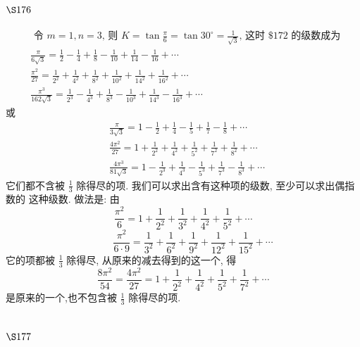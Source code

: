 \section{$\S 176$}
\[
\begin{aligned}
& \text { 令 } m=1, n=3 \text {, 则 } K=\tan \frac{\pi}{6}=\tan 30^{\circ}=\frac{1}{\sqrt{3}} \text {, 这时 } \$ 172 \text { 的级数成为 } \\
& \frac{\pi}{6 \sqrt{3}}=\frac{1}{2}-\frac{1}{4}+\frac{1}{8}-\frac{1}{10}+\frac{1}{14}-\frac{1}{16}+\cdots \\
& \frac{\pi^{2}}{27}=\frac{1}{2^{2}}+\frac{1}{4^{2}}+\frac{1}{8^{2}}+\frac{1}{10^{2}}+\frac{1}{14^{2}}+\frac{1}{16^{2}}+\cdots \\
& \frac{\pi^{3}}{162 \sqrt{3}}=\frac{1}{2^{3}}-\frac{1}{4^{3}}+\frac{1}{8^{3}}-\frac{1}{10^{3}}+\frac{1}{14^{3}}-\frac{1}{16^{3}}+\cdots
\end{aligned}
\]
或
\[
\begin{aligned}
& \frac{\pi}{3 \sqrt{3}}=1-\frac{1}{2}+\frac{1}{4}-\frac{1}{5}+\frac{1}{7}-\frac{1}{8}+\cdots \\
& \frac{4 \pi^{2}}{27}=1+\frac{1}{2^{2}}+\frac{1}{4^{2}}+\frac{1}{5^{2}}+\frac{1}{7^{2}}+\frac{1}{8^{2}}+\cdots \\
& \frac{4 \pi^{3}}{81 \sqrt{3}}=1-\frac{1}{2^{3}}+\frac{1}{4^{3}}-\frac{1}{5^{3}}+\frac{1}{7^{3}}-\frac{1}{8^{3}}+\cdots
\end{aligned}
\]
它们都不含被 $\frac{1}{3}$ 除得尽的项. 我们可以求出含有这种项的级数, 至少可以求出偶指数的 这种级数. 做法是: 由
\[
\frac{\pi^{2}}{6}=1+\frac{1}{2^{2}}+\frac{1}{3^{2}}+\frac{1}{4^{2}}+\frac{1}{5^{2}}+\cdots
\]
\[
 \qquad \frac{\pi^{2}}{6 \cdot 9}=\frac{1}{3^{2}}+\frac{1}{6^{2}}+\frac{1}{9^{2}}+\frac{1}{12^{2}}+\frac{1}{15^{2}}+\cdots
\]
它的项都被 $\frac{1}{3}$ 除得尽, 从原来的减去得到的这一个, 得
\[
\frac{8 \pi^{2}}{54}=\frac{4 \pi^{2}}{27}=1+\frac{1}{2^{2}}+\frac{1}{4^{2}}+\frac{1}{5^{2}}+\frac{1}{7^{2}}+\cdots
\]
是原来的一个,也不包含被 $\frac{1}{3}$ 除得尽的项.

\section{$\S 177$}

